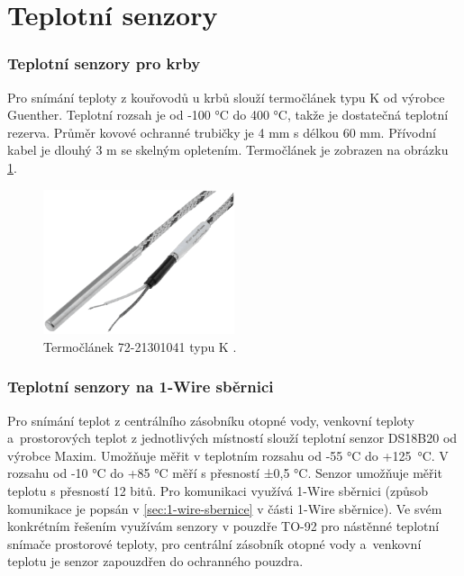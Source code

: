 \section{Teplotní senzory}
\subsubsection{Teplotní senzory pro krby}
\label{sec:teplotni-senzory-pro-krby}
Pro snímání teploty z kouřovodů u krbů slouží termočlánek typu K od výrobce Guenther. Teplotní rozsah je od -100 °C do 400 °C, takže je dostatečná teplotní rezerva. Průměr kovové ochranné trubičky je 4 mm s délkou 60 mm. Přívodní kabel je dlouhý 3 m se skelným opletením. Termočlánek je zobrazen na obrázku \ref{fig:termoclanek-72-21301041-k}.

\begin{figure}[H]
    \centering
    \includegraphics[width=0.5\textwidth]{images/termoclanek-72-21301041-k.png}
    \caption[Termočlánek 72-21301041 typu K.]{Termočlánek 72-21301041 typu K \cite{termoclanek-k}.}
    \label{fig:termoclanek-72-21301041-k}
\end{figure}

\subsubsection{Teplotní senzory na 1-Wire sběrnici}
Pro snímání teplot z centrálního zásobníku otopné vody, venkovní teploty a~prostorových teplot z jednotlivých místností slouží teplotní senzor DS18B20 od výrobce Maxim. Umožňuje měřit
v teplotním rozsahu od -55 °C do +125~°C. V rozsahu od -10 °C do +85 °C měří s přesností ±0,5 °C. Senzor umožňuje měřit teplotu s přesností 12 bitů. Pro komunikaci využívá 1-Wire sběrnici (způsob komunikace je popsán v \ref{sec:1-wire-sbernice} v části 1-Wire sběrnice). Ve svém konkrétním řešením využívám senzory v pouzdře TO-92 pro nástěnné teplotní snímače prostorové teploty, pro centrální zásobník otopné vody a~venkovní teplotu je senzor zapouzdřen do ochranného pouzdra.



